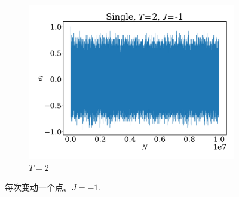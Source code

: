 \documentclass[12pt]{article}
\begin{document}
\begin{figure}
\begin{subfigure}[b]{0.49\textwidth}
		\includegraphics[width=\textwidth]{fig1DJ1N1e7/sig_s_T2J-1.pdf}
		\caption{$T=2$}
	\end{subfigure}
	\caption{每次变动一个点。$J=-1$.}
	\label{fig:EsJ-1}
\end{figure}
\end{document}
